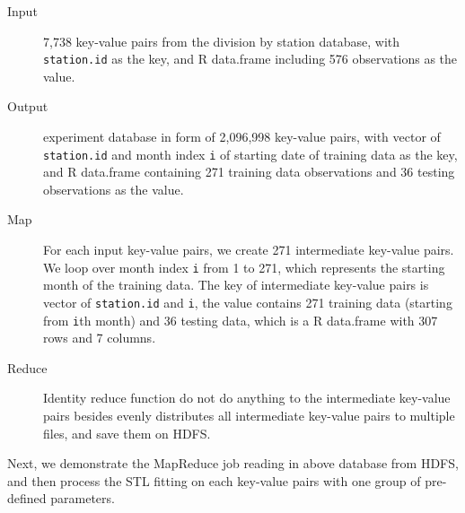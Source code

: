 \begin{description}
  \item[Input] 7,738 key-value pairs from the division by station database, with 
  \texttt{station.id} as the key, and R data.frame including 576 observations as
  the value.
  \item[Output] experiment database in form of 2,096,998 key-value pairs, with 
  vector of \texttt{station.id} and month index \texttt{i} of starting date of 
  training data as the key, and R data.frame containing 271 training data 
  observations and 36 testing observations as the value.
  \item[Map] For each input key-value pairs, we create 271 intermediate key-value
  pairs. We loop over month index \texttt{i} from 1 to 271, which represents the
  starting month of the training data. The key of intermediate key-value pairs
  is vector of \texttt{station.id} and \texttt{i}, the value contains 271 
  training data (starting from \texttt{i}th month) and 36 testing data, which is 
  a R data.frame with 307 rows and 7 columns.
  \item[Reduce] Identity reduce function do not do anything to the intermediate 
  key-value pairs besides evenly distributes all intermediate key-value pairs to 
  multiple files, and save them on HDFS.
\end{description} 

Next, we demonstrate the MapReduce job reading in above database from HDFS, and 
then process the STL fitting on each key-value pairs with one group of pre-defined 
parameters. 

